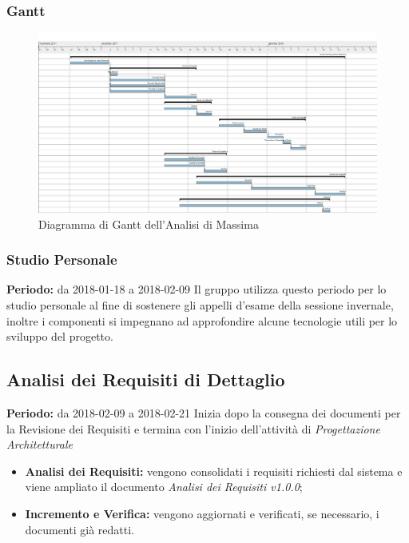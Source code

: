 \subsubsection{Gantt}
\begin{figure}[H]
	\centering 
	\includegraphics[width=1\textwidth]{images/Analisi-di-Massima.png}
	\caption{Diagramma di Gantt dell'Analisi di Massima}
	\label{graficobello} 
\end{figure}
\subsubsection{Studio Personale}
\textbf{Periodo:} da 2018-01-18 a 2018-02-09 \Spazio
Il gruppo utilizza questo periodo per lo studio personale al fine di sostenere gli appelli d'esame della sessione invernale, inoltre i componenti si impegnano ad approfondire alcune tecnologie utili per lo sviluppo del progetto.
\subsection{Analisi dei Requisiti di Dettaglio}
    \textbf{Periodo:} da 2018-02-09 a 2018-02-21 \Spazio
    Inizia dopo la consegna dei documenti per la Revisione dei Requisiti e termina con l'inizio dell'attività di \emph{Progettazione Architetturale}
    \begin{itemize}
    	\item \textbf{Analisi dei Requisiti:} vengono consolidati i requisiti richiesti dal sistema e viene ampliato il documento \emph{Analisi dei Requisiti v1.0.0};
    	\item \textbf{Incremento e Verifica:} vengono aggiornati e verificati, se necessario, i documenti già redatti. 
    \end{itemize}
